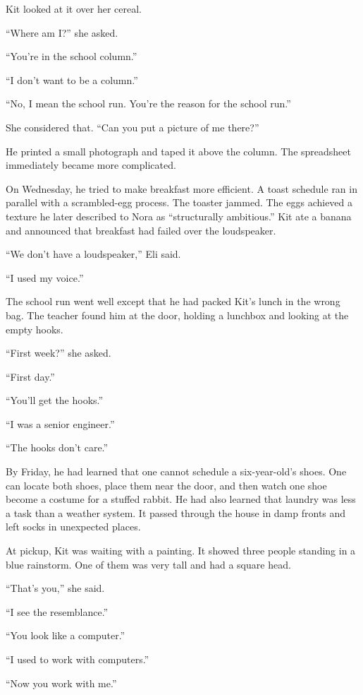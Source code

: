 \documentclass[11pt,openany]{book}
\begin{document}
Kit looked at it over her cereal.

``Where am I?'' she asked.

``You're in the school column.''

``I don't want to be a column.''

``No, I mean the school run. You're the reason for the school run.''

She considered that. ``Can you put a picture of me there?''

He printed a small photograph and taped it above the column. The spreadsheet immediately became more complicated.

On Wednesday, he tried to make breakfast more efficient. A toast schedule ran in parallel with a scrambled-egg process. The toaster jammed. The eggs achieved a texture he later described to Nora as ``structurally ambitious.'' Kit ate a banana and announced that breakfast had failed over the loudspeaker.

``We don't have a loudspeaker,'' Eli said.

``I used my voice.''

The school run went well except that he had packed Kit's lunch in the wrong bag. The teacher found him at the door, holding a lunchbox and looking at the empty hooks.

``First week?'' she asked.

``First day.''

``You'll get the hooks.''

``I was a senior engineer.''

``The hooks don't care.''

By Friday, he had learned that one cannot schedule a six-year-old's shoes. One can locate both shoes, place them near the door, and then watch one shoe become a costume for a stuffed rabbit. He had also learned that laundry was less a task than a weather system. It passed through the house in damp fronts and left socks in unexpected places.

At pickup, Kit was waiting with a painting. It showed three people standing in a blue rainstorm. One of them was very tall and had a square head.

``That's you,'' she said.

``I see the resemblance.''

``You look like a computer.''

``I used to work with computers.''

``Now you work with me.''
\end{document}
